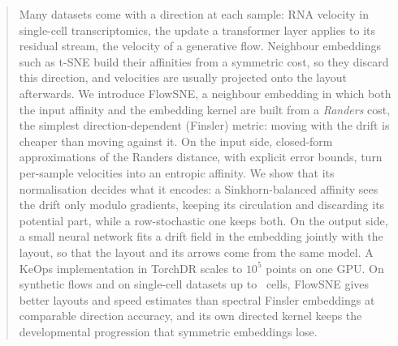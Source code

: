 \begin{abstract}
  Many datasets come with a direction at each sample: RNA velocity in
  single-cell transcriptomics, the update a transformer layer applies to
  its residual stream, the velocity of a generative flow. Neighbour
  embeddings such as t-SNE build their affinities from a symmetric cost,
  so they discard this direction, and velocities are usually projected
  onto the layout afterwards. We introduce FlowSNE, a neighbour
  embedding in which both the input affinity and the embedding kernel are
  built from a \emph{Randers} cost, the simplest direction-dependent
  (Finsler) metric: moving with the drift is cheaper than moving against
  it. On the input side, closed-form approximations of the Randers
  distance, with explicit error bounds, turn per-sample velocities into an
  entropic affinity. We show that its normalisation decides what it
  encodes: a Sinkhorn-balanced affinity sees the drift only modulo
  gradients, keeping its circulation and discarding its potential part,
  while a row-stochastic one keeps both. On the output side, a small
  neural network fits a drift field in the embedding jointly with the
  layout, so that the layout and its arrows come from the same model.
  A KeOps implementation in TorchDR scales to $10^5$ points on one GPU.
  On synthetic flows and on single-cell datasets up to
  ~cells, FlowSNE gives better layouts and speed estimates than
  spectral Finsler embeddings at comparable direction accuracy, and its
  own directed kernel keeps the developmental progression that
  symmetric embeddings lose.
\end{abstract}
